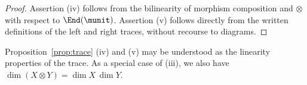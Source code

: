 \begin{proof}
	Assertion (iv) follows from the bilinearity of morphism composition and
$\otimes$ with respect to $\End(\munit)$. Assertion (v) follows directly
from the written definitions of the left and right traces, without recourse
to diagrams.
\end{proof}

Proposition~\ref{prop:trace} (iv) and (v) may be understood as the linearity
properties of the trace. As a special case of (iii), we also have
$\dim(X\otimes Y)=\dim X\,\dim Y$.
